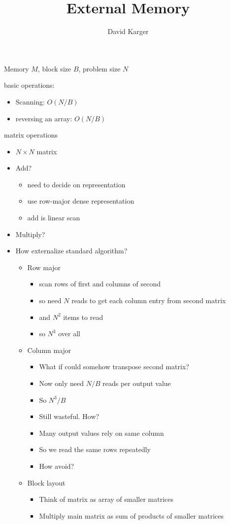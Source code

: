 \documentclass{article}
\title{External Memory}
\author{David Karger}
\begin{document}
Memory $M$, block size $B$, problem size $N$

basic operations:
\begin{itemize}
\item Scanning: $O(N/B)$
\item reversing an array: $O(N/B)$
\end{itemize}

matrix operations
\begin{itemize}
\item $N\times N$ matrix
\item Add?
\begin{itemize}
\item need to decide on representation
\item use row-major dense representation
\item add is linear scan
\end{itemize}
\item Multiply?
\item How externalize standard algorithm?
\begin{itemize}
\item Row major
\begin{itemize}
\item scan rows of first and columns of second
\item so need $N$ reads to get each column entry from second matrix
\item and $N^2$ items to read
\item so $N^3$ over all
\end{itemize}
\item Column major
\begin{itemize}
\item What if could somehow transpose second matrix?
\item Now only need $N/B$ reads per output value
\item So $N^3/B$
\item Still wasteful. How?
\item Many output values rely on same column
\item So we read the same rows repeatedly
\item How avoid?
\end{itemize}
\item Block layout
\begin{itemize}
\item Think of matrix as array of smaller matrices
\item Multiply main matrix as sum of products of smaller matrices

\end{itemize}
\end{itemize}
\end{itemize}
\end{document}
